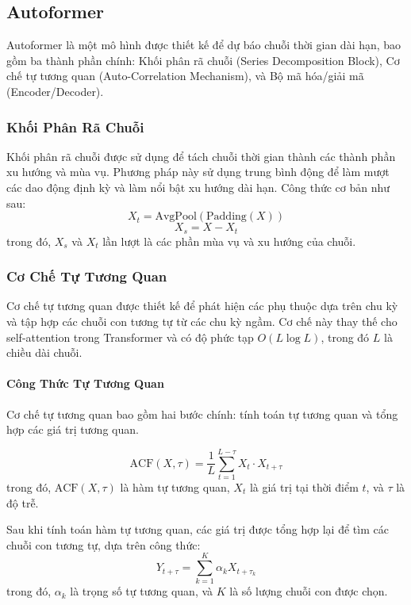 \subsection{Autoformer}

Autoformer là một mô hình được thiết kế để dự báo chuỗi thời gian dài hạn, bao gồm ba thành phần chính: Khối phân rã chuỗi (Series Decomposition Block), Cơ chế tự tương quan (Auto-Correlation Mechanism), và Bộ mã hóa/giải mã (Encoder/Decoder).

\subsubsection{Khối Phân Rã Chuỗi}

Khối phân rã chuỗi được sử dụng để tách chuỗi thời gian thành các thành phần xu hướng và mùa vụ. Phương pháp này sử dụng trung bình động để làm mượt các dao động định kỳ và làm nổi bật xu hướng dài hạn. Công thức cơ bản như sau:
\[
X_t = \text{AvgPool}(\text{Padding}(X))
\]
\[
X_s = X - X_t
\]
trong đó, $X_s$ và $X_t$ lần lượt là các phần mùa vụ và xu hướng của chuỗi.

\subsubsection{Cơ Chế Tự Tương Quan}

Cơ chế tự tương quan được thiết kế để phát hiện các phụ thuộc dựa trên chu kỳ và tập hợp các chuỗi con tương tự từ các chu kỳ ngầm. Cơ chế này thay thế cho self-attention trong Transformer và có độ phức tạp $O(L \log L)$, trong đó $L$ là chiều dài chuỗi.

\paragraph{Công Thức Tự Tương Quan}

Cơ chế tự tương quan bao gồm hai bước chính: tính toán tự tương quan và tổng hợp các giá trị tương quan.

\[
\text{ACF}(X, \tau) = \frac{1}{L} \sum_{t=1}^{L-\tau} X_t \cdot X_{t+\tau}
\]
trong đó, $\text{ACF}(X, \tau)$ là hàm tự tương quan, $X_t$ là giá trị tại thời điểm $t$, và $\tau$ là độ trễ.

Sau khi tính toán hàm tự tương quan, các giá trị được tổng hợp lại để tìm các chuỗi con tương tự, dựa trên công thức:
\[
Y_{t+\tau} = \sum_{k=1}^{K} \alpha_k X_{t+\tau_k}
\]
trong đó, $\alpha_k$ là trọng số tự tương quan, và $K$ là số lượng chuỗi con được chọn.

